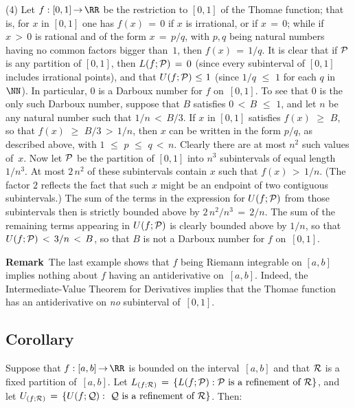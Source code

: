 \V

        (4) Let $f:[0,1] \,{\rightarrow}\, {\RR}$ be the restriction to $[0,1]$ of the Thomae function;
    that is, for $x$ in $[0,1]$ one has $f(x) \,=\, 0$ if $x$ is irrational, or if $x \,=\, 0$;
    while if $x\,>\,0$ is rational and of the form $x \,=\, p/q$, with $p, q$ being natural numbers having no common factors bigger than~$1$, then $f(x) \,=\, 1/q$.
    It is clear that if ${\cal P}$ is any partition of $[0,1]$, then $L(f;{\cal P}) \,=\, 0$ (since every subinterval of $[0,1]$ includes irrational points),
    and that $U(f;{\cal P})\,\,{\leq}\,\,1$ (since $1/q\,\,{\leq}\,\,1$ for each $q$ in~${\NN}$). In particular, $0$ is a Darboux number for $f$ on~$[0,1]$.
    To see that $0 $ is the only such Darboux number, suppose that $B$ satisfies $0\,<\,B\,\,{\leq}\,\,1$, and let $n$ be any natural number such that $1/n\,<\,B/3$.
    If $x$ in $[0,1]$ satisfies $f(x)\,\,{\geq}\,\,B$, so that $f(x)\,\,{\geq}\,\,B/3\,>\,1/n$, then $x$ can be written in the form $p/q$,
    as described above, with $1\,\,{\leq}\,\,p\,\,{\leq}\,\,q\,<\,n$.
    Clearly there are at most $n^{2}$ such values of~$x$. Now let ${\cal P}$ be the partition of $[0,1]$ into $n^{3}$ subintervals of equal length $1/n^{3}$.
    At most $2\,n^{2}$ of these subintervals contain $x$ such that $f(x)\,>\,1/n$. (The factor $2$ reflects the fact that such $x$ might be an endpoint of two contiguous subintervals.)
    The sum of the terms in the expression for $U(f;{\cal P})$ from those subintervals then is strictly bounded above by $2\,n^{2}/n^{3} \,=\, 2/n$.
    The sum of the remaining terms appearing in $U(f;{\cal P})$ is clearly bounded above by $1/n$, so that $U(f;{\cal P})\,<\,3/n\,<\,B$, so that $B$ is not a Darboux number for $f$ on~$[0,1]$.

\V

        {\bf Remark}\, The last example shows that $f$ being Riemann integrable on $[a,b]$ implies nothing about $f$ having an antiderivative on~$[a,b]$.
    Indeed, the Intermediate-Value Theorem for Derivatives implies that the Thomae function has an antiderivative on {\em no} subinterval of~$[0,1]$.

\VV

        \subsection{\small{{\bf Corollary}}}
        \label{CorH20.35A}

\V

        Suppose that $f:[a,b] \,{\rightarrow}\, {\RR}$ is bounded on the interval~$[a,b]$ and that ${\cal R}$ is a fixed partition of~$[a,b]$.
    Let $L_{(f;{\cal R})} \,=\, \{L(f; {\cal P}): \mbox{${\cal P}$ is a refinement of ${\cal R}$}\}$,
    and let $U_{(f;{\cal R})} \,=\, \{U(f; {\cal Q}): \mbox{ ${\cal Q}$ is a refinement of ${\cal R}$}\}$. Then:

